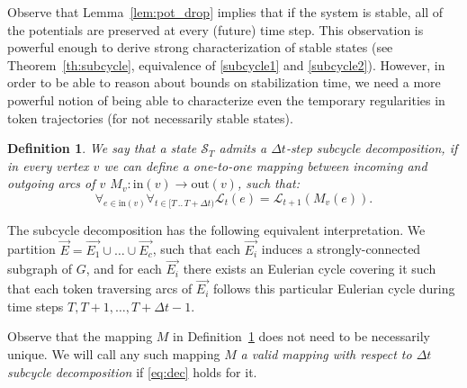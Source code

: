 \documentclass{article}[11pt,letter]
\newtheorem{definition}{Definition}[section]
\newcommand{\state}{\mathcal{S}}
\newcommand{\inedg}{\mathrm{in}}
\newcommand{\outedg}{\mathrm{out}}
\newcommand{\load}{\mathcal{L}}
\newcommand{\dt}{\Delta t}
\newcommand{\halfrange}[2]{[#1\,..\,#2)}
\begin{document}
Observe that Lemma~\ref{lem:pot_drop} implies that if the system is stable, all of the potentials are preserved at every (future) time step. This observation is powerful enough to derive strong characterization of stable states (see Theorem~\ref{th:subcycle}, equivalence of \eqref{subcycle1} and \eqref{subcycle2}). However, in order to be able to reason about bounds on stabilization time, we need a more powerful notion of being able to characterize even the temporary regularities in token trajectories (for not necessarily stable states).

\begin{definition}
\label{def:dec}
We say that a state $\state_{T}$ admits a \emph{$\dt$-step subcycle decomposition}, if in every vertex $v$ we can define a one-to-one mapping between incoming and outgoing arcs of $v$ $M_v : \inedg(v) \to \outedg(v)$, such that:
\begin{equation}
\label{eq:dec}
\forall_{e \in \inedg(v)}  \forall_{t \in \halfrange{T}{T+\dt}} \load_{t}(e) = \load_{t+1}(M_v(e)). \end{equation}
\end{definition}
The subcycle decomposition has the following equivalent interpretation. We partition $\vec{E} = \vec{E_1} \cup \ldots \cup \vec{E_c}$, such that each $\vec{E_i}$ induces a strongly-connected subgraph of $G$, and for each $\vec{E_i}$ there exists an Eulerian cycle covering it such that each token traversing arcs of $\vec{E_i}$ follows this particular Eulerian cycle during time steps $T,T+1,\ldots,T+\dt-1$.

Observe that the mapping $M$ in Definition~\ref{def:dec} does not need to be necessarily unique. We will call any such mapping $M$ \emph{a valid mapping with respect to $\dt$ subcycle decomposition} if \eqref{eq:dec} holds for it.
\end{document}
